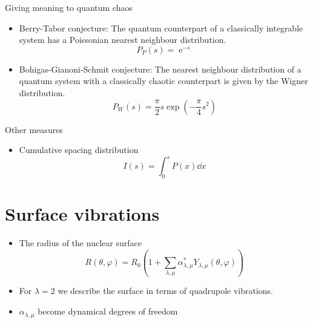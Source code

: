 \documentclass[a4,compress]{beamer}
\newcommand{\ee}{\operatorname{e}}          %
\begin{document}

\begin{frame}{Giving meaning to quantum chaos}
  \begin{itemize}
    \item Berry-Tabor conjecture: The quantum counterpart of a classically integrable
    system has a Poissonian nearest neighbour distribution.
    \[
      P_P(s) = \ee^{-s}
    \]
    \item Bohigas-Gianoni-Schmit conjecture: The nearest neighbour distribution
    of a quantum system with a classically chaotic counterpart is given by
    the Wigner distribution.
    \[
      P_W(s) = \frac{\pi}{2} s \exp(-\frac{\pi}{4} s^2)
    \]
  \end{itemize}
\end{frame}


\begin{frame}{Other measures}
  \begin{itemize}
    \item Cumulative spacing distribution
    \[
      I(s) = \int_0^s P(x) \dd{x}
    \]
  \end{itemize}
\end{frame}

\section[Model]{Surface vibrations}


\begin{frame}
  \begin{itemize}
    \item The radius of the nuclear surface
    \[
      R(\theta, \varphi) = R_0 \left( 1 + \sum_{\lambda, \mu}
          \alpha_{\lambda,\mu}^* Y_{\lambda,\mu}(\theta, \varphi) \right)
    \]
    \item For \(\lambda = 2\) we describe the surface in terms of
    quadrupole vibrations.
    \item \(\alpha_{\lambda,\mu}\) become dynamical degrees of freedom
  \end{itemize}
\end{frame}

\end{document}
